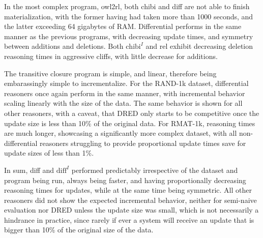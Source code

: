 \documentclass[sigconf,screen,review,natbib]{acmart}
\theoremstyle{definition}
\begin{document}
In the most complex program, owl2rl, both chibi and diff are not able to finish materialization, with the former having had taken more than 1000 seconds, and the latter
exceeding 64 gigabytes of RAM. Differential performs in the same manner as the previous programs, with decreasing update times, and symmetry between additions and
deletions. Both $\text{chibi}^{I}$ and rel exhibit decreasing deletion reasoning times in aggressive cliffs, with little decrease for additions.

The transitive closure program is simple, and linear, therefore being embarassingly simple to incrementalize. For the RAND-1k dataset, differential reasoners once again
perform in the same manner, with incremental behavior scaling linearly with the size of the data. The same behavior is shown for all other reasoners, with a caveat, that
DRED only starts to be competitive once the update size is less than 10\% of the original data. For RMAT-1k, reasoning times are much longer, showcasing a significantly
more complex dataset, with all non-differential reasoners struggling to provide proportional update times save for update sizes of less than 1\%.

In sum, diff and $\text{diff}^{I}$ performed predictably irrespective of the dataset and program being run, always being faster, and having proportionally decreasing reasoning
times for updates, while at the same time being symmetric. All other reasoners did not show the expected incremental behavior, neither for semi-naive evaluation nor DRED unless
the update size was small, which is not necessarily a hindrance in practice, since rarely if ever a system will receive an update that is bigger than 10\% of the original size
of the data.
\end{document}
